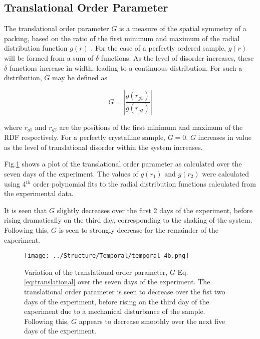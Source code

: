 \documentclass[10pt,a4paper]{article}
\begin{document}
\subsection{Translational Order Parameter}

The translational order parameter $G$ is a measure of the spatial symmetry of a packing, based on the ratio of the first minimum and maximum of the radial distribution function $g(r)$ \cite{Olafsen2010}. For the case of a perfectly ordered sample, $g(r)$ will be formed from a sum of $\delta$ functions. As the level of disorder increases, these $\delta$ functions increase in width, leading to a continuous distribution. For such a distribution,  
$G$ may be defined as

\begin{equation}
G = \left|\frac{g(r_{g1})}{g(r_{g2})} \right|
\label{eq:translational}
\end{equation}

where $r_{g1}$ and $r_{g2}$ are the positions of the first minimum and maximum of the RDF respectively. For a perfectly crystalline sample, $G=0$. $G$ increases in value as the level of translational disorder within the system increases.

Fig.\ref{fig:translational_order_parameter} shows a plot of the translational order parameter as calculated over the seven days of the experiment. The values of $g(r_1)$ and $g(r_2)$ were calculated using 4$^{th}$ order polynomial fits to the radial distribution functions calculated from the experimental data. 

It is seen that $G$ slightly decreases over the first 2 days of the experiment, before rising dramatically on the third day, corresponding to the shaking of the system. Following this, $G$ is seen to strongly decrease for the remainder of the experiment. 

\begin{figure}[H]
\centering
\texttt{[image: ../Structure/Temporal/temporal\_4b.png]}
\caption{Variation of the translational order parameter, $G$ Eq.\ref{eq:translational} over the seven days of the experiment. The translational order parameter is seen to decrease over the fist two days of the experiment, before rising on the third day of the experiment due to a mechanical disturbance of the sample. Following this, $G$ appears to decrease smoothly over the next five days of the experiment.}
\label{fig:translational_order_parameter}
\end{figure}
\end{document}
